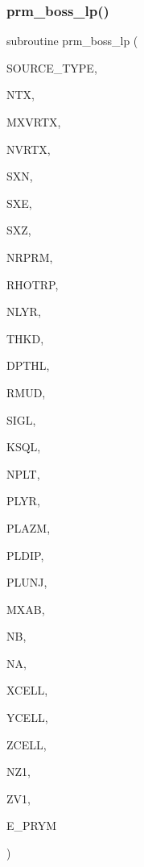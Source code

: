 \subsubsection{\texorpdfstring{prm\+\_\+boss\+\_\+lp()}{prm\_boss\_lp()}}
{\footnotesize\ttfamily subroutine prm\+\_\+boss\+\_\+lp (\begin{DoxyParamCaption}\item[{integer}]{S\+O\+U\+R\+C\+E\+\_\+\+T\+Y\+PE,  }\item[{integer}]{N\+TX,  }\item[{integer}]{M\+X\+V\+R\+TX,  }\item[{integer, dimension(ntx)}]{N\+V\+R\+TX,  }\item[{real, dimension (mxvrtx,ntx)}]{S\+XN,  }\item[{real, dimension (mxvrtx,ntx)}]{S\+XE,  }\item[{real, dimension(ntx)}]{S\+XZ,  }\item[{integer}]{N\+R\+P\+RM,  }\item[{real, dimension(nrprm)}]{R\+H\+O\+T\+RP,  }\item[{integer}]{N\+L\+YR,  }\item[{real(kind=ql), dimension(nlyr)}]{T\+H\+KD,  }\item[{real(kind=ql), dimension(nlyr)}]{D\+P\+T\+HL,  }\item[{real(kind=ql), dimension(0\+:nlyr)}]{R\+M\+UD,  }\item[{complex(kind=ql), dimension(nlyr)}]{S\+I\+GL,  }\item[{complex(kind=ql), dimension(nlyr)}]{K\+S\+QL,  }\item[{integer}]{N\+P\+LT,  }\item[{integer, dimension(nplt)}]{P\+L\+YR,  }\item[{real, dimension (nplt)}]{P\+L\+A\+ZM,  }\item[{real, dimension (nplt)}]{P\+L\+D\+IP,  }\item[{real, dimension (nplt)}]{P\+L\+U\+NJ,  }\item[{integer}]{M\+X\+AB,  }\item[{integer, dimension(nplt)}]{NB,  }\item[{integer, dimension(nplt)}]{NA,  }\item[{real, dimension(mxab,nplt)}]{X\+C\+E\+LL,  }\item[{real, dimension(mxab,nplt)}]{Y\+C\+E\+LL,  }\item[{real, dimension(mxab,nplt)}]{Z\+C\+E\+LL,  }\item[{integer}]{N\+Z1,  }\item[{real, dimension(nz1)}]{Z\+V1,  }\item[{complex, dimension(2,mxab,ntx,nplt)}]{E\+\_\+\+P\+R\+YM }\end{DoxyParamCaption})}

